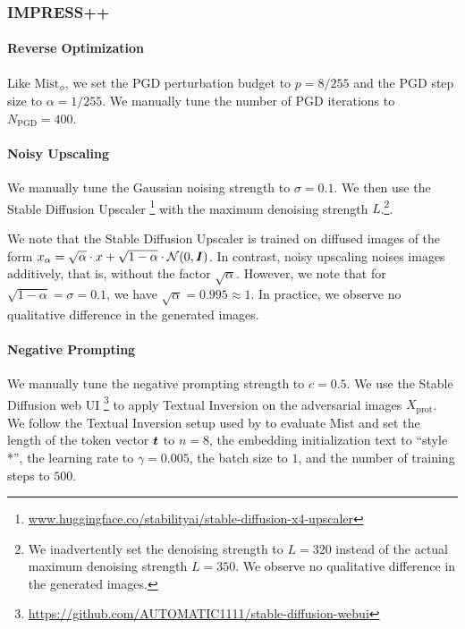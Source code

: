 \documentclass{article}
\newcommand{\advimgset}[0]{X_{\textrm{prot}}}
\newcommand{\mistenc}[0]{$\textrm{Mist}_{\phi}$}
\begin{document}
\subsubsection{IMPRESS++}

\paragraph{Reverse Optimization}\label{sec:revoptexp} Like \mistenc, we set the PGD perturbation budget to $p = 8 / 255$ and the PGD step size to $\alpha = 1/255$. We manually tune the number of PGD iterations to $N_{\mathrm{PGD}} = 400$.

\paragraph{Noisy Upscaling}\label{sec:noisyupscalingexp} We manually tune the Gaussian noising strength to
$\sigma = 0.1$. We then use the Stable Diffusion Upscaler \footnote{\url{www.huggingface.co/stabilityai/stable-diffusion-x4-upscaler}} with the maximum denoising strength $L$.\footnote{We inadvertently set the denoising strength to $L = 320$ instead of the actual maximum denoising strength $L = 350$. We observe no qualitative difference in the generated images.}.

We note that the Stable Diffusion Upscaler is trained on
diffused images of the form $x_{\alpha} = \sqrt{\alpha} \cdot x + \sqrt{1 - \alpha} \cdot \mathrm{\mathcal{N}}\!\left(0, {\bm{I}}\right)$. In contrast,
noisy upscaling noises images additively, that is, without the factor $\sqrt{\alpha}$. However, we note that for $\sqrt{1 - \alpha} = \sigma = 0.1$, we have $\sqrt{\alpha} = 0.995 \approx 1$. In practice,
we observe no qualitative difference in the generated images.

\paragraph{Negative Prompting}\label{sec:negpromptexp} We manually tune the negative prompting strength to $c = 0.5$. We use the Stable Diffusion web UI \footnote{\url{https://github.com/AUTOMATIC1111/stable-diffusion-webui}} to apply Textual Inversion on
the adversarial images $\advimgset$. We follow the Textual Inversion
setup used by \citeauthor{mist} to evaluate Mist and set the length of the token vector ${\bm{t}}$ to $n=8$, the embedding initialization text
to ``style *'', the learning rate to $\gamma = 0.005$, the batch size
to $1$, and the number of training steps to $500$.
\end{document}
